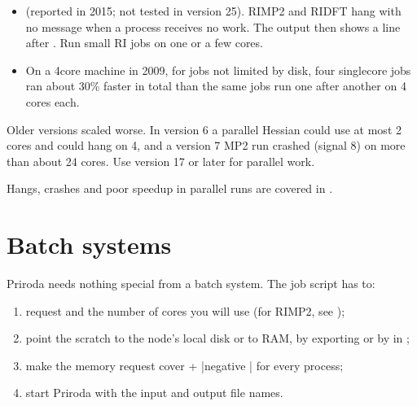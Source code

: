 \documentclass[letterpaper,10pt,english,openany,oneside]{sphinxmanual}
\begin{document}
\begin{itemize}
\item {} 
\sphinxAtStartPar
{} (reported in 2015; not tested in version 25). RI\sphinxhyphen{}MP2 and RI\sphinxhyphen{}DFT hang
with no message when a process receives no work. The output then shows a line  after
. Run small RI jobs on one or a few cores.



\item {} 
\sphinxAtStartPar
{} On a 4\sphinxhyphen{}core machine in 2009, for jobs not limited by
disk, four single\sphinxhyphen{}core jobs ran about 30\% faster in total than the same jobs run one after another on 4 cores each.



\end{itemize}

\sphinxAtStartPar
Older versions scaled worse. In version 6 a parallel Hessian could use at most 2 cores and could hang on 4, and a
version 7 MP2 run crashed (signal 8) on more than about 24 cores. Use version 17 or later for parallel work.



\sphinxAtStartPar
Hangs, crashes and poor speed\sphinxhyphen{}up in parallel runs are covered in {\hyperref[\detokenize{troubleshooting/common-problems:troubleshooting-parallel}]{}}.


\section{Batch systems}
\label{\detokenize{start/parallel:batch-systems}}\label{\detokenize{start/parallel:running-batch}}
\sphinxAtStartPar
Priroda needs nothing special from a batch system. The job script has to:
\begin{enumerate}
%
\item {} 
\sphinxAtStartPar
request  and the number of cores you will use (for RI\sphinxhyphen{}MP2, see
{\hyperref[\detokenize{start/parallel:running-parallel-scaling}]{}});

\item {} 
\sphinxAtStartPar
point the scratch to the node’s local disk or to RAM, by exporting  or by  in ;

\item {} 
\sphinxAtStartPar
make the memory request cover  + |negative | for every process;

\item {} 
\sphinxAtStartPar
start Priroda with the input and output file names.

\end{enumerate}
\end{document}
